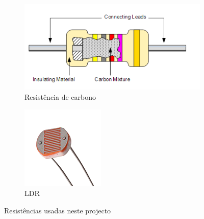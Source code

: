 \documentclass[12pt]{article}
\begin{document}
\begin{figure}[h!]
  \centering
  \begin{subfigure}[b]{0.5\linewidth}
    \includegraphics[width=\linewidth]{imgs/resistor.png}
    \caption{Resistência de carbono}
  \end{subfigure}
  \begin{subfigure}[b]{0.3\linewidth}
    \includegraphics[width=\linewidth]{imgs/photoresistor.png}
    \caption{LDR}
  \end{subfigure}
  \caption{Resistências usadas neste projecto}
  \label{fig:aeroplats}
\end{figure}
\end{document}
